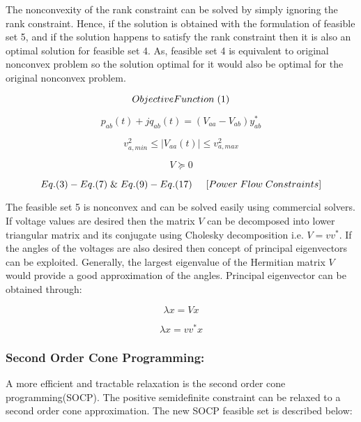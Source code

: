 The nonconvexity of the rank constraint can be solved by simply ignoring the rank constraint. Hence, if the solution is obtained with the formulation of feasible set 5, and if the solution happens to satisfy the rank constraint then it is also an optimal solution for feasible set 4. As, feasible set 4 is equivalent to original nonconvex problem so the solution optimal for it would also be optimal for the original nonconvex problem.  

\begin{tcolorbox}[colback=gray!5!white,colframe=gray!25!black,title=Feasible Set 5 (Convex Semidefinite Power Flow):]
\[
Objective Function\hspace{0.1cm}(1)
\]

\[
  p_{ab}(t) + jq_{ab}(t)= \left ( V_{aa} - V_{ab} \right )y_{ab}^\ast
\]

\[
  v_{a,min}^2\leq \left |V_{aa}(t) \right | \leq v_{a,max}^2  
\]

\[
    V\succeq0
\]

\[
Eq.(3) - Eq.(7)\hspace{0.1cm} \&\hspace{0.1cm} Eq.(9) - Eq.(17) \hspace{0.5cm} [Power \hspace{0.1cm} Flow \hspace{0.1cm}  Constraints] 
\]
\end{tcolorbox}

The feasible set 5 is nonconvex and can be solved easily using commercial solvers. If voltage values are desired then the matrix $V$ can be decomposed into lower triangular matrix and its conjugate using Cholesky decomposition i.e. $V=vv^\ast$. If the angles of the voltages are also desired then concept of principal eigenvectors can be exploited. Generally, the largest eigenvalue of the Hermitian matrix $V$ would provide a good approximation of the angles. Principal eigenvector can be obtained through: 

\[
\lambda x = Vx
\]

\[
\lambda x = vv^\ast x
\]

\subsubsection{Second Order Cone Programming:}

A more efficient and tractable relaxation is the second order cone programming(SOCP). The positive semidefinite constraint can be relaxed to a second order cone approximation. The new SOCP feasible set is described below:

